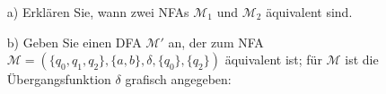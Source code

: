 
\begin{exercise}
\vspace*{0.1cm}
\begin{itemize}
\item[a)] Erklären Sie, wann zwei NFAs  $\mathcal{M}_1$ und $\mathcal{M}_2$ äquivalent sind. 
\item[b)] Geben Sie einen DFA  $\mathcal{M}'$ an, der zum NFA  $\mathcal{M}=(\{q_0,q_1,q_2\},\{a,b\},\delta, \{q_0\}, \{q_2\})$ äquivalent ist;
  für $\mathcal{M}$ ist die Übergangsfunktion $\delta$ grafisch angegeben:\\[0.5cm]
\begin{center}
  
\end{center}
\end{itemize}
\end{exercise}

